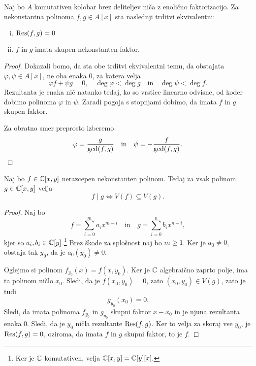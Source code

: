 \begin{izrek}
Naj bo $A$ komutativen kolobar brez deliteljev niča z enolično
faktorizacijo. Za nekonstantna polinoma $f, g \in A[x]$ sta
naslednji trditvi ekvivalentni:

\begin{enumerate}[i)]
\item $\operatorname{Res}(f,g) = 0$
\item $f$ in $g$ imata skupen nekonstanten faktor.
\end{enumerate}
\end{izrek}

\begin{proof}
Dokazali bomo, da sta obe trditvi ekvivalentni temu, da obstajata
$\varphi, \psi \in A[x]$, ne oba enaka $0$, za katera velja
\[
\varphi f + \psi g = 0,
\quad
\deg \varphi < \deg g
\quad \text{in} \quad
\deg \psi < \deg f.
\]
Rezultanta je enaka nič natanko tedaj, ko so vrstice linearno
odvisne, od koder dobimo polinoma $\varphi$ in $\psi$. Zaradi
pogoja s stopnjami dobimo, da imata $f$ in $g$ skupen faktor.

Za obratno smer preprosto izberemo
\[
\varphi = \frac{g}{\gcd(f,g)}
\quad \text{in} \quad
\psi = -\frac{f}{\gcd(f,g)}. \qedhere
\]
\end{proof}

\begin{lema}[Study]
Naj bo $f \in \mathbb{C}[x,y]$ nerazcepen nekonstanten polinom. Tedaj za
vsak polinom $g \in \mathbb{C}[x,y]$ velja
\[
f \mid g \iff V(f) \subseteq V(g).
\]
\end{lema}

\begin{proof}
Naj bo
\[
f = \sum_{i=0}^m a_i x^{m-i}
\quad \text{in} \quad
g = \sum_{i=0}^n b_i x^{n-i},
\]
kjer so $a_i, b_i \in \mathbb{C}[y]$.\footnote{Ker je $\mathbb{C}$ komutativen,
velja $\mathbb{C}[x,y] = \mathbb{C}[y][x]$.} Brez škode za splošnost naj bo
$m \geq 1$. Ker je $a_0 \ne 0$, obstaja tak $y_0$, da je
$a_0(y_0) \ne 0$.

Oglejmo si polinom $f_{y_0}(x) = f(x,y_0)$. Ker je $\mathbb{C}$ algebraično
zaprto polje, ima ta polinom ničlo $x_0$. Sledi, da je
$f(x_0, y_0) = 0$, zato $(x_0, y_0) \in V(g)$, zato je tudi
\[
g_{y_0}(x_0) = 0.
\]
Sledi, da imata polinoma $f_{y_0}$ in $g_{y_0}$ skupni faktor
$x - x_0$ in je njuna rezultanta enaka $0$. Sledi, da je $y_0$
ničla rezultante $\operatorname{Res}(f,g)$. Ker to velja za skoraj vse $y_0$, je
$\operatorname{Res}(f,g) = 0$, oziroma, da imata $f$ in $g$ skupni faktor, to je
$f$.
\end{proof}

